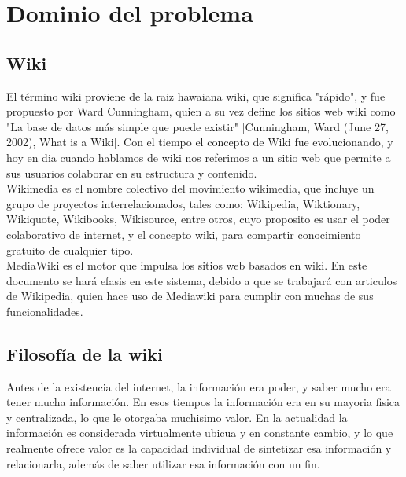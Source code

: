 
\iffalse  \fi

\section{Dominio del problema}
    \subsection{Wiki}

        El término wiki proviene de la raiz hawaiana wiki, que significa "rápido", y fue propuesto por Ward Cunningham, quien a su vez define los sitios web wiki como "La base de datos más simple que puede existir" [Cunningham, Ward (June 27, 2002), What is a Wiki]. Con el tiempo el concepto de Wiki fue evolucionando, y hoy en dia cuando hablamos de wiki nos referimos a un sitio web que permite a sus usuarios colaborar en su estructura y contenido.\\
        
        Wikimedia es el nombre colectivo del movimiento wikimedia, que incluye un grupo de proyectos interrelacionados, tales como: Wikipedia, Wiktionary, Wikiquote, Wikibooks, Wikisource, entre otros, cuyo proposito es usar el poder colaborativo de internet, y el concepto wiki, para compartir conocimiento gratuito de cualquier tipo.\\
        
        MediaWiki es el motor que impulsa los sitios web basados en wiki. En este documento se hará efasis en este sistema, debido a que se trabajará con articulos de Wikipedia, quien hace uso de Mediawiki para cumplir con muchas de sus funcionalidades.

    \subsection{Filosofía de la wiki}

        \iffalse  \fi
        
        Antes de la existencia del internet, la información era poder, y saber mucho era tener mucha información. En esos tiempos la información era en su mayoria fisica y centralizada, lo que le otorgaba muchisimo valor. En la actualidad la información es considerada virtualmente ubicua y en constante cambio, y lo que realmente ofrece valor es la capacidad individual de sintetizar esa información y relacionarla, además de saber utilizar esa información con un fin.

